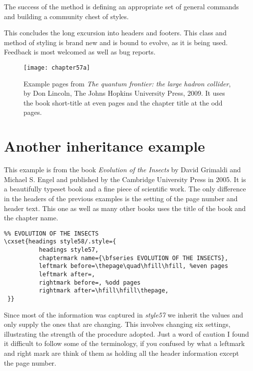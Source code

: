 The success of the method is defining an appropriate set of general commands and building a community chest of styles.

This concludes the long excursion into headers and footers. This class and method of styling is brand new and is bound to evolve, as it is being used. Feedback is most welcomed as well as bug reports.
\begin{figure}[tp]
\centering
\texttt{[image: chapter57a]}\vspace{0.5\baselineskip}
\caption{Example pages from \textit{The quantum frontier: the large hadron collider}, by Don Lincoln, The Johns Hopkins University Press, 2009.  It uses the book short-title at even pages and the chapter title at the odd pages.}
\end{figure}

\section{Another inheritance example}

This example is from the book \textit{Evolution of the Insects} by David Grimaldi and Michael S. Engel and published by the Cambridge University Press in 2005. It is a beautifully typeset book and a fine piece of scientific work. The only difference in the headers of the previous examples is the setting of the page number and header text. This one as well as many other books uses the title of the book and the chapter name.

\begin{tcolorbox}
\begin{lstlisting}
%% EVOLUTION OF THE INSECTS
\cxset{headings style58/.style={
          headings style57,
          chaptermark name={\bfseries EVOLUTION OF THE INSECTS},
          leftmark before=\thepage\quad\hfill\hfill, %even pages
          leftmark after=,
          rightmark before=, %odd pages
          rightmark after=\hfill\hfill\thepage,
 }}
\end{lstlisting}
\end{tcolorbox}

Since most of the information was captured in \textit{style57} we inherit the values and only supply the ones  that are changing. This involves changing six settings, illustrating the strength of the procedure adopted. Just a word of caution I found it difficult to follow some of the terminology, if you confused by what a leftmark and right mark are think of them as holding all the header information except the page number.



